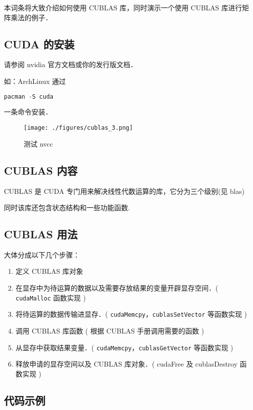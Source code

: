 
本词条将大致介绍如何使用 CUBLAS 库，同时演示一个使用 CUBLAS 库进行矩阵乘法的例子．
\subsection{CUDA 的安装}
请参阅 nvidia 官方文档或你的发行版文档．

如：ArchLinux 通过
\begin{lstlisting}[language=cpp]
pacman -S cuda
\end{lstlisting}
一条命令安装．

\begin{figure}[ht]
\centering
\texttt{[image: ./figures/cublas\_3.png]}
\caption{测试 nvcc} \label{cublas_fig3}
\end{figure}

\subsection{CUBLAS 内容}%

CUBLAS 是 CUDA 专门用来解决线性代数运算的库，它分为三个级别(见 blas)

同时该库还包含状态结构和一些功能函数.

\subsection{CUBLAS 用法}%

大体分成以下几个步骤：

\begin{enumerate}
  \item 定义 CUBLAS 库对象 
  \item  在显存中为待运算的数据以及需要存放结果的变量开辟显存空间．( \verb|cudaMalloc| 函数实现 )
  \item  将待运算的数据传输进显存．( \verb|cudaMemcpy|，\verb|cublasSetVector| 等函数实现 )
  \item 调用 CUBLAS 库函数 ( 根据 CUBLAS 手册调用需要的函数 )
  \item 从显存中获取结果变量．( \verb|cudaMemcpy|，\verb|cublasGetVector| 等函数实现 )
  \item  释放申请的显存空间以及 CUBLAS 库对象．( cudaFree 及 cublasDestroy 函数实现 )
\end{enumerate}

\subsection{代码示例}%

